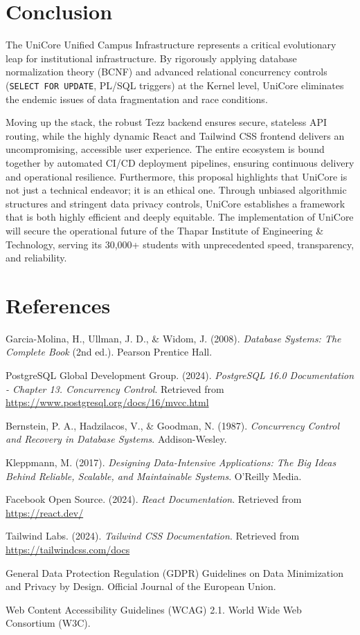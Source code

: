 \documentclass[11pt,a4paper]{article}
\begin{document}
\section{Conclusion}

The UniCore Unified Campus Infrastructure represents a critical evolutionary leap for institutional infrastructure. By rigorously applying database normalization theory (BCNF) and advanced relational concurrency controls (\texttt{SELECT FOR UPDATE}, PL/SQL triggers) at the Kernel level, UniCore eliminates the endemic issues of data fragmentation and race conditions. 

Moving up the stack, the robust Tezz backend ensures secure, stateless API routing, while the highly dynamic React and Tailwind CSS frontend delivers an uncompromising, accessible user experience. The entire ecosystem is bound together by automated CI/CD deployment pipelines, ensuring continuous delivery and operational resilience. Furthermore, this proposal highlights that UniCore is not just a technical endeavor; it is an ethical one. Through unbiased algorithmic structures and stringent data privacy controls, UniCore establishes a framework that is both highly efficient and deeply equitable. The implementation of UniCore will secure the operational future of the Thapar Institute of Engineering \& Technology, serving its 30,000+ students with unprecedented speed, transparency, and reliability.

\newpage
\section{References}

\begin{enumerate}[label={[\arabic*]}]
    \item Garcia-Molina, H., Ullman, J. D., \& Widom, J. (2008). \textit{Database Systems: The Complete Book} (2nd ed.). Pearson Prentice Hall.
    \item PostgreSQL Global Development Group. (2024). \textit{PostgreSQL 16.0 Documentation - Chapter 13. Concurrency Control}. Retrieved from \url{https://www.postgresql.org/docs/16/mvcc.html}
    \item Bernstein, P. A., Hadzilacos, V., \& Goodman, N. (1987). \textit{Concurrency Control and Recovery in Database Systems}. Addison-Wesley.
    \item Kleppmann, M. (2017). \textit{Designing Data-Intensive Applications: The Big Ideas Behind Reliable, Scalable, and Maintainable Systems}. O'Reilly Media.
    \item Facebook Open Source. (2024). \textit{React Documentation}. Retrieved from \url{https://react.dev/}
    \item Tailwind Labs. (2024). \textit{Tailwind CSS Documentation}. Retrieved from \url{https://tailwindcss.com/docs}
    \item General Data Protection Regulation (GDPR) Guidelines on Data Minimization and Privacy by Design. Official Journal of the European Union.
    \item Web Content Accessibility Guidelines (WCAG) 2.1. World Wide Web Consortium (W3C).
\end{enumerate}
\end{document}
